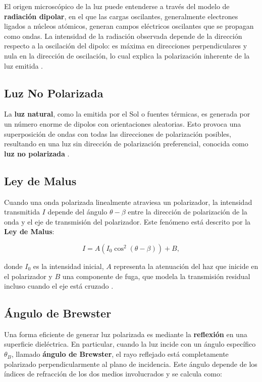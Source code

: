 \documentclass[article,12pt]{elsarticle}
\begin{document}
El origen microscópico de la luz puede entenderse a través del modelo de \textbf{radiación dipolar}, en el que las cargas oscilantes, generalmente electrones ligados a núcleos atómicos, generan campos eléctricos oscilantes que se propagan como ondas. La intensidad de la radiación observada depende de la dirección respecto a la oscilación del dipolo: es máxima en direcciones perpendiculares y nula en la dirección de oscilación, lo cual explica la polarización inherente de la luz emitida \cite{griffiths1999, Polarizacion}.

\subsection{Luz No Polarizada}

La \textbf{luz natural}, como la emitida por el Sol o fuentes térmicas, es generada por un número enorme de dipolos con orientaciones aleatorias. Esto provoca una superposición de ondas con todas las direcciones de polarización posibles, resultando en una luz sin dirección de polarización preferencial, conocida como \textbf{luz no polarizada} \cite{hecht2000, Polarizacion}.

\subsection{Ley de Malus}

Cuando una onda polarizada linealmente atraviesa un polarizador, la intensidad transmitida \(I\) depende del ángulo \(\theta - \beta\) entre la dirección de polarización de la onda y el eje de transmisión del polarizador. Este fenómeno está descrito por la \textbf{Ley de Malus}:

\begin{mdframed}
\begin{equation}
    I = A(I_0 \cos^2 (\theta - \beta)) + B,
\end{equation}
\end{mdframed}

donde \(I_0\) es la intensidad inicial, \(A\) representa la atenuación del haz que inicide en el  polarizador y \(B\) una componente de fuga, que modela la transmisión residual incluso cuando el eje está cruzado \cite{pedrotti2018, Polarizacion}.

\subsection{Ángulo de Brewster}

Una forma eficiente de generar luz polarizada es mediante la \textbf{reflexión} en una superficie dieléctrica. En particular, cuando la luz incide con un ángulo específico \(\theta_B\), llamado \textbf{ángulo de Brewster}, el rayo reflejado está completamente polarizado perpendicularmente al plano de incidencia. Este ángulo depende de los índices de refracción de los dos medios involucrados y se calcula como:
\end{document}
